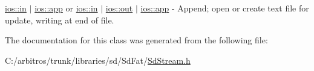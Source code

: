 \hyperlink{classios__base_a371ab336bfce00a620526ba26f9be813}{ios\-::in} $|$ \hyperlink{classios__base_a64d9d8299325373c7033d9712e25d02c}{ios\-::app} or \hyperlink{classios__base_a371ab336bfce00a620526ba26f9be813}{ios\-::in} $|$ \hyperlink{classios__base_a5300f1b3e0fe12cc7c484ab89f8bba83}{ios\-::out} $|$ \hyperlink{classios__base_a64d9d8299325373c7033d9712e25d02c}{ios\-::app} -\/ Append; open or create text file for update, writing at end of file. 

The documentation for this class was generated from the following file\-:\begin{DoxyCompactItemize}
\item 
C\-:/arbitros/trunk/libraries/sd/\-Sd\-Fat/\hyperlink{_sd_stream_8h}{Sd\-Stream.\-h}\end{DoxyCompactItemize}
